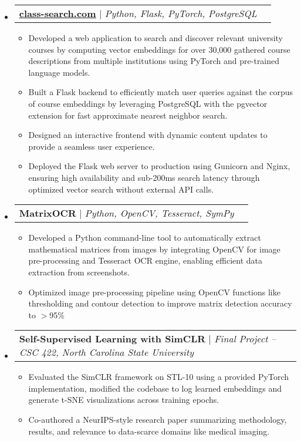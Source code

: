 \documentclass[letterpaper,10pt]{article}
\makeatletter
\newcommand{\resumeItem}[1]{
  \item\small{
    {#1 \vspace{-2pt}}
  }
}
\newcommand{\resumeProjectHeading}[2]{
    \item
    \begin{tabular*}{0.97\textwidth}{l@{\extracolsep{\fill}}r}
      \small#1 & #2 \\
    \end{tabular*}\vspace{-7pt}
}
\newcommand{\resumeSubHeadingListStart}{\begin{itemize}[leftmargin=0.15in, label={}]}
\newcommand{\resumeSubHeadingListEnd}{\end{itemize}}
\newcommand{\resumeItemListStart}{\begin{itemize}}
\newcommand{\resumeItemListEnd}{\end{itemize}\vspace{-5pt}}
\makeatother
\begin{document}
         \resumeSubHeadingListStart
     \resumeProjectHeading
          {\textbf{\href{https://www.class-search.com}{\underline{class-search.com}}} $|$ \emph{Python, Flask, PyTorch, PostgreSQL}}{}
          \resumeItemListStart
          		\resumeItem{Developed a web application to search and discover relevant university courses by computing vector embeddings for over 30,000 gathered course descriptions from multiple institutions using PyTorch and pre-trained language models.}
          		\resumeItem{Built a Flask backend to efficiently match user queries against the corpus of course embeddings by leveraging PostgreSQL with the pgvector extension for fast approximate nearest neighbor search.}
          		\resumeItem{Designed an interactive frontend with dynamic content updates to provide a seamless user experience.}
          		\resumeItem{Deployed the Flask web server to production using Gunicorn and Nginx, ensuring high availability and sub-200ms search latency through optimized vector search without external API calls.}

         \resumeItemListEnd
    \resumeSubHeadingListEnd
    
         \resumeSubHeadingListStart
     \resumeProjectHeading
          {\textbf{MatrixOCR} $|$ \emph{Python, OpenCV, Tesseract, SymPy}}{}
          \resumeItemListStart
            \resumeItem{Developed a Python command-line tool to automatically extract mathematical matrices from images by integrating OpenCV for image pre-processing and Tesseract OCR engine, enabling efficient data extraction from screenshots.}
            \resumeItem{Optimized image pre-processing pipeline using OpenCV functions like thresholding and contour detection to improve matrix detection accuracy to $>$95\%}
            
         \resumeItemListEnd
    \resumeSubHeadingListEnd
    
    \resumeSubHeadingListStart
     \resumeProjectHeading
          {\textbf{Self-Supervised Learning with SimCLR} $|$ \emph{Final Project – CSC 422, North Carolina State University}}{}
          \resumeItemListStart
            \resumeItem{Evaluated the SimCLR framework on STL-10 using a provided PyTorch implementation, modified the codebase to log learned embeddings and generate t-SNE visualizations across training epochs.}
           	\resumeItem{Co-authored a NeurIPS-style research paper summarizing methodology, results, and relevance to data-scarce domains like medical imaging.}
         \resumeItemListEnd
    \resumeSubHeadingListEnd
	
\end{document}

